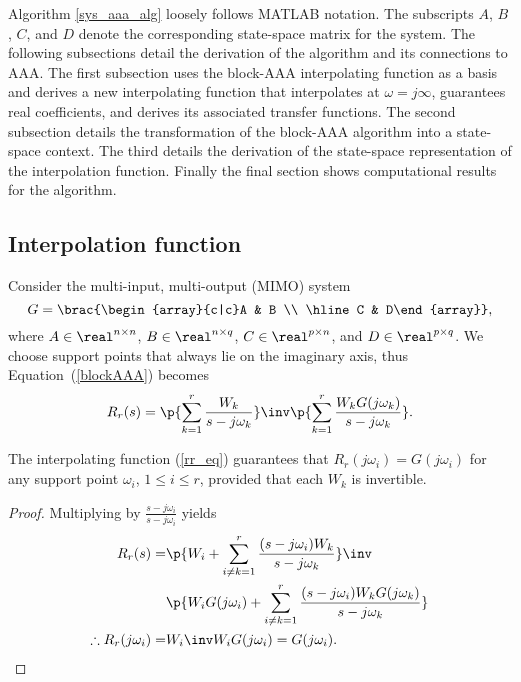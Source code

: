 \documentclass[letterpaper, 10 pt, conference]{ieeeconf}  %
\begin{document}
Algorithm \ref{sys_aaa_alg} loosely follows MATLAB notation.  The subscripts \(A\), \(B\), \(C\), and \(D\) denote the corresponding state-space matrix for the system.  The following subsections detail the derivation of the algorithm and its connections to AAA.  The first subsection uses the block-AAA interpolating function as a basis and derives a new interpolating function that interpolates at \(\omega=j\infty\), guarantees real coefficients, and derives its associated transfer functions.  The second subsection details the transformation of the block-AAA algorithm into a state-space context.  The third details the derivation of the state-space representation of the interpolation function.  Finally the final section shows computational results for the algorithm.  

\subsection{Interpolation function}
Consider the multi-input, multi-output (MIMO) system 
\[G = \brac{\begin{array}{c|c}A & B \\ \hline C & D\end{array}},\]
where \(A\in\real^{n\times n}\), \(B\in\real^{n\times q}\), \(C\in\real^{p\times n}\), and \(D\in\real^{p\times q}\). We choose support points that always lie on the imaginary axis, thus Equation~(\ref{blockAAA}) becomes
\begin{equation}
        R_r(s) = \p{\sum_{k=1}^r \frac{W_k}{s - j\omega_k}}\inv \p{\sum_{k=1}^r \frac{W_k G(j\omega_k)}{s-j\omega_k}}. \label{rr_eq}
\end{equation}
\begin{remark} \label{rem_int}
        The interpolating function (\ref{rr_eq}) guarantees that \(R_r(j\omega_i) = G(j\omega_i)\) for any support point \(\omega_i\), \(1\leq i \leq r\), provided that each \(W_k\) is invertible.    

        \begin{proof}
                Multiplying by \(\frac{s-j\omega_i}{s-j\omega_i}\) yields 
                \begin{align*}
                    R_r(s) =& \p{W_i + \sum_{i\neq k = 1}^r \frac{(s-j\omega_i) W_k}{s-j\omega_k}}\inv \\
                    & \p{W_iG(j\omega_i) + \sum_{i\neq k = 1}^r \frac{(s-j\omega_i) W_kG(j\omega_k)}{s-j\omega_k}} \\
                    \therefore R_r(j\omega_i) =& W_i\inv W_i G(j\omega_i) = G(j\omega_i).
                \end{align*}
        \end{proof}
\end{remark}
\end{document}
